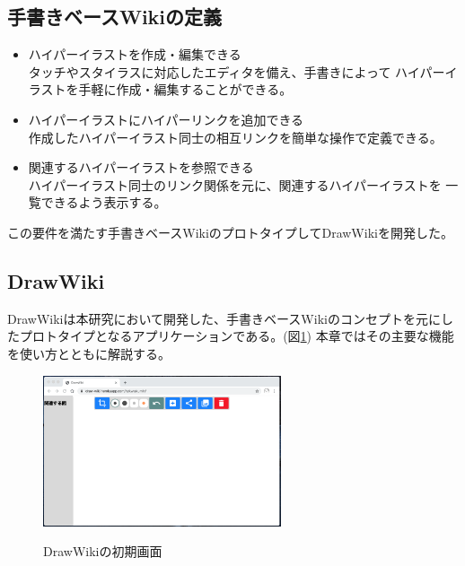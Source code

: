 \subsection{手書きベースWikiの定義}
\begin{itemize}
    \item ハイパーイラストを作成・編集できる\\
    タッチやスタイラスに対応したエディタを備え、手書きによって
    ハイパーイラストを手軽に作成・編集することができる。
    \item ハイパーイラストにハイパーリンクを追加できる \\
    作成したハイパーイラスト同士の相互リンクを簡単な操作で定義できる。
    \item 関連するハイパーイラストを参照できる \\
    ハイパーイラスト同士のリンク関係を元に、関連するハイパーイラストを
    一覧できるよう表示する。
\end{itemize}
この要件を満たす手書きベースWikiのプロトタイプしてDrawWikiを開発した。

\subsection{DrawWiki}
DrawWikiは本研究において開発した、手書きベースWikiのコンセプトを元にしたプロトタイプとなるアプリケーションである。(図\ref{drawwiki})
本章ではその主要な機能を使い方とともに解説する。

\begin{figure}[htbp]
    \begin{center}
    {\includegraphics[width=70mm]{images/initialdrawwiki.png}} \end{center}
    \caption{DrawWikiの初期画面}
    \label{drawwiki}
\end{figure}

%

